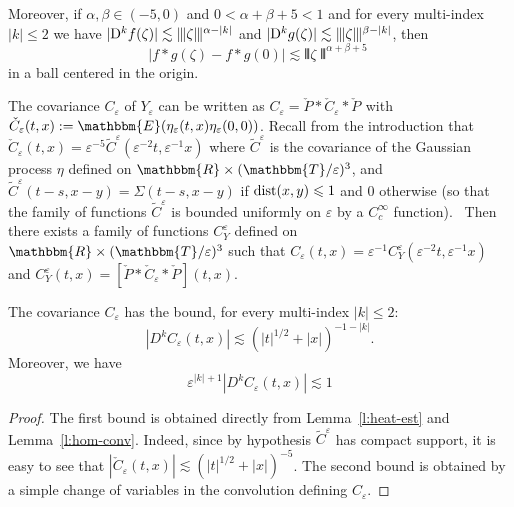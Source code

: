 \begin{appendices}
\begin{lemma}
  Moreover, if $\alpha, \beta \in (- 5, 0)$ and $0 < \alpha + \beta + 5 < 1$
  and for every multi-index $| k | \leqslant 2$ we have $| \mathrm{D}^k f (\zeta)
  | \lesssim \interleave \zeta \interleave^{\alpha - | k |}$ and $| \mathrm{D}^k g
  (\zeta) | \lesssim \interleave \zeta \interleave^{\beta - | k |}$, then
  \[ |f \ast g (\zeta) - f \ast g (0) | \lesssim \interleave \zeta
     \interleave^{\alpha + \beta + 5} \]
  in a ball centered in the origin.
\end{lemma}

\begin{remark}
  \label{r:rescaling-properties-cov}The covariance $C_{\varepsilon}$ of
  $Y_{\varepsilon}$ can be written as $C_{\varepsilon} = \check{P} \ast
  \check{C}_{\varepsilon} \ast \check{P}_{}$ with $\check{C}_{\varepsilon} (t,
  x) \assign \mathbbm{E} (\eta_{\varepsilon} (t, x) \eta_{\varepsilon} (0,
  0))$. Recall from the introduction that $\check{C}_{\varepsilon} (t, x) =
  \varepsilon^{- 5} \tilde{C}^{\varepsilon} (\varepsilon^{- 2} t,
  \varepsilon^{- 1} x)$ where $\tilde{C}^{\varepsilon}$ is the covariance of
  the Gaussian process $\eta$ defined on $\mathbbm{R} \times (\mathbbm{T}/
  \varepsilon)^3$, and $\tilde{C}^{\varepsilon} (t - s, x - y) = \Sigma (t -
  s, x - y)$ if $\operatorname{dist} (x, y) \leqslant 1$ and $0$ otherwise (so that
  the family of functions $\tilde{C}^{\varepsilon}$ is bounded uniformly on
  $\varepsilon$ by a $C^{\infty}_c$ function). \ Then there exists a family of
  functions $C_Y^{\varepsilon}$ defined on $\mathbbm{R} \times (\mathbbm{T}/
  \varepsilon)^3$ such that $C_{\varepsilon} (t, x) = \varepsilon^{- 1}
  C_Y^{\varepsilon} (\varepsilon^{- 2} t, \varepsilon^{- 1} x)$ and
  $C_Y^{\varepsilon} (t, x) = [\check{P} \ast \check{C}_{\varepsilon} \ast
  \check{P}_{}] (t, x)$.
\end{remark}

\begin{lemma}
  \label{l:cov-est-eps}The covariance $C_{\varepsilon}$
  \label{l:cov-est-tx}has the bound, for every multi-index $| k | \leqslant
  2$:
  \[ | D^k C_{\varepsilon} (t, x) | \lesssim (| t |^{1 / 2} + | x |)^{- 1 - |
     k |} . \]
  Moreover, we have
  \[ \varepsilon^{| k |_{} + 1} | D^k C_{\varepsilon} (t, x) | \lesssim 1 \]
\end{lemma}

\begin{proof}
  The first bound is obtained directly from Lemma~\ref{l:heat-est} and
  Lemma~\ref{l:hom-conv}. Indeed, since by hypothesis
  $\tilde{C}^{\varepsilon}$ has compact support, it is easy to see that $|
  \check{C}_{\varepsilon} (t, x) | \lesssim (| t |^{1 / 2} + | x |)^{- 5}$.
  The second bound is obtained by a simple change of variables in the
  convolution defining $C_{\varepsilon}$. 
\end{proof}


\end{appendices}
